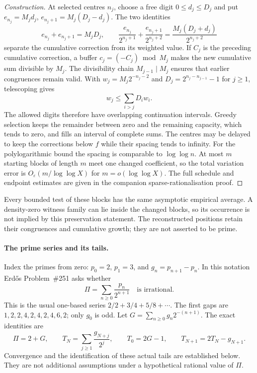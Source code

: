 \documentclass[11pt]{article}
\begin{document}
\begin{proof}[Construction]
At selected centres $n_j$, choose a free digit $0\le d_j\le D_j$ and put
$e_{n_j}=M_jd_j$, $e_{n_j+1}=M_j(D_j-d_j)$.  The two identities
\[
 e_{n_j}+e_{n_j+1}=M_jD_j,\qquad
 \frac{e_{n_j}}{2^{n_j+1}}+\frac{e_{n_j+1}}{2^{n_j+2}}
   =\frac{M_j(D_j+d_j)}{2^{n_j+2}}
\]
separate the cumulative correction from its weighted value.
If $C_j$ is the preceding cumulative correction, a buffer
$c_j=(-C_j)\bmod M_j$ makes the new cumulative sum divisible by $M_j$.
The divisibility chain $M_{j-1}\mid M_j$ ensures that earlier congruences
remain valid.  With $w_j=M_j2^{-n_j-2}$ and
$D_j=2^{n_j-n_{j-1}}-1$ for $j\ge1$, telescoping gives
\[
 w_j\le\sum_{i>j}D_iw_i.
\]
The allowed digits therefore have overlapping continuation intervals.
Greedy selection keeps the remainder between zero and the remaining
capacity, which tends to zero, and fills an interval of complete sums.
The centres may be delayed to keep the corrections below $f$ while their
spacing tends to infinity.  For the polylogarithmic bound the spacing is
comparable to $\log\log n$.  At most $m$ starting blocks of length $m$ meet
one changed coefficient, so the total variation error is
$O_\varepsilon(m/\log\log X)$ for $m=o(\log\log X)$.
The full schedule and endpoint estimates are given in the companion
sparse-rationalisation proof.
\end{proof}

Every bounded test of these blocks has the same asymptotic empirical
average.  A density-zero witness family can lie inside the changed blocks,
so its occurrence is not implied by this preservation statement.
The reconstructed positions retain their congruences and cumulative growth;
they are not asserted to be prime.

\paragraph{The prime series and its tails.}
Index the primes from zero: $p_0=2$, $p_1=3$, and
$g_n=p_{n+1}-p_n$.  In this notation Erd\H{o}s Problem~\#251 asks whether
\[
 \Pi=\sum_{n\ge0}\frac{p_n}{2^{n+1}}
 \quad\text{is irrational}.
\]
This is the usual one-based series $2/2+3/4+5/8+\cdots$.
The first gaps are $1,2,2,4,2,4,2,4,6,2$; only $g_0$ is odd.
Let $G=\sum_{n\ge0}g_n2^{-(n+1)}$.  The exact identities are
\[
 \Pi=2+G,\qquad
 T_N=\sum_{j\ge1}\frac{g_{N+j}}{2^j},\qquad
 T_0=2G-1,\qquad T_{N+1}=2T_N-g_{N+1}.
\]
Convergence and the identification of these actual tails are established
below.  They are not additional assumptions under a hypothetical rational
value of $\Pi$.
\end{document}
